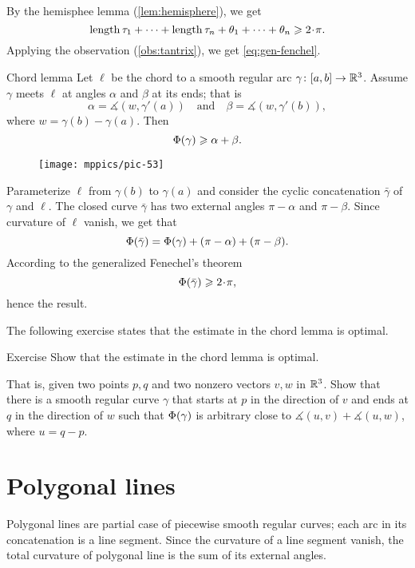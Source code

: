 By the hemisphee lemma (\ref{lem:hemisphere}), we get 
\[\length\tau_1+\dots+\length\tau_n+\theta_1+\dots+\theta_n\ge 2\cdot\pi.\]
Applying the observation (\ref{obs:tantrix}), we get \ref{eq:gen-fenchel}.
\qedsf

\begin{thm}{Chord lemma}\label{lem:chord}
Let $\ell$ be the chord to a smooth regular arc $\gamma\colon[a,b]\to\mathbb{R}^3$.
Assume $\gamma$ meets $\ell$ at angles $\alpha$ and $\beta$ at its ends;
that is 
\[\alpha=\measuredangle(w,\gamma'(a))\quad\text{and}\quad \beta=\measuredangle(w,\gamma'(b)),\]
where $w=\gamma(b)-\gamma(a)$.
Then 
\[\Phi({\gamma})\geqslant \alpha+\beta.\] 

\end{thm}

\begin{wrapfigure}{r}{45 mm}
\vskip-7mm
\centering
\texttt{[image: mppics/pic-53]}
\vskip0mm
\end{wrapfigure}


Parameterize $\ell$ from $\gamma(b)$ to $\gamma(a)$ and consider the cyclic concatenation $\bar\gamma$ of $\gamma$ and $\ell$.
The closed curve $\bar\gamma$ has two external angles $\pi-\alpha$ and $\pi-\beta$.
Since curvature of $\ell$ vanish, we get that 
\[\Phi({\bar\gamma})=\Phi({\gamma})+(\pi-\alpha)+(\pi-\beta).\]
According to the generalized Fenechel's theorem
\[\tc{\bar\gamma}\ge 2\cdot\pi,\]
hence the result.
\qeds

The following exercise states that the estimate in the chord lemma is optimal.

\begin{thm}{Exercise}\label{ex:chord-lemma-optimal}
Show that the estimate in the chord lemma is optimal.

That is, given two points $p, q$ and two nonzero vectors $v,w$ in $\mathbb{R}^3$.
Show that there is a smooth regular curve $\gamma$ that starts at $p$ in the direction of $v$ and ends at $q$ in the direction of $w$ such that 
$\Phi({\gamma})$ is arbitrary close to $\measuredangle(u,v)+\measuredangle(u,w)$, where $u=q-p$.

\end{thm}

\section*{Polygonal lines} 

Polygonal lines are partial case of piecewise smooth regular curves;
each arc in its concatenation is a line segment.
Since the curvature of a line segment vanish, the total curvature of polygonal line is the sum of its external angles.

